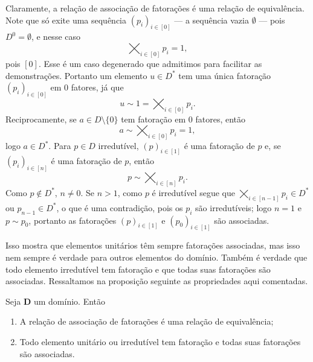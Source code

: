 
Claramente, a relação de associação de fatorações é uma relação de equivalência. Note que só exite uma sequência $(p_i)_{i \in [0]}$ --- a sequência vazia $\emptyset$ --- pois $D^0=\emptyset$, e nesse caso
	\begin{equation*}
	\bigtimes_{i \in [0]} p_i = 1,
	\end{equation*}
pois $[0]$. Esse é um caso degenerado que admitimos para facilitar as demonstrações. Portanto um elemento $u \in D^*$ tem uma única fatoração $(p_i)_{i \in [0]}$ em $0$ fatores, já que
	\begin{equation*}
	u \sim 1 = \bigtimes_{i \in [0]} p_i.
	\end{equation*}
Reciprocamente, se $a \in D\setminus\{0\}$ tem fatoração em $0$ fatores, então
	\begin{equation*}
	a \sim \bigtimes_{i \in [0]} p_i = 1,
	\end{equation*}
logo $a \in D^*$. Para $p \in D$ irredutível, $(p)_{i \in [1]}$ é uma fatoração de $p$ e, se $(p_i)_{i \in [n]}$ é uma fatoração de $p$, então
	\begin{equation*}
	p \sim \bigtimes_{i \in [n]} p_i.
	\end{equation*}
Como $p \notin D^*$, $n \neq 0$. Se $n>1$, como $p$ é irredutível segue que $\bigtimes_{i \in [n-1]} p_i \in D^*$ ou $p_{n-1} \in D^*$, o que é uma contradição, pois os $p_i$ são irredutíveis; logo $n=1$ e $p \sim p_0$, portanto as fatorações $(p)_{i \in [1]}$ e $(p_0)_{i \in [1]}$ são associadas.

Isso mostra que elementos unitários têm sempre fatorações associadas, mas isso nem sempre é verdade para outros elementos do domínio. Também é verdade que todo elemento irredutível tem fatoração e que todas suas fatorações são associadas. Ressaltamos na proposição seguinte as propriedades aqui comentadas.

\begin{proposition}
Seja $\bm D$ um domínio. Então
	\begin{enumerate}
	\item A relação de associação de fatorações é uma relação de equivalência;
	\item Todo elemento unitário ou irredutível tem fatoração e todas suas fatorações são associadas.
	\end{enumerate}
\end{proposition}

